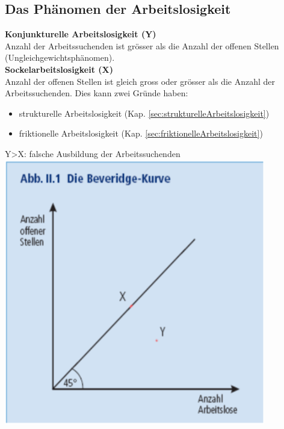 \subsection{Das Phänomen der Arbeitslosigkeit}
\begin{multicols}{2}
\textbf{Konjunkturelle Arbeitslosigkeit (Y)}\\
Anzahl der Arbeitssuchenden ist grösser als die Anzahl der offenen Stellen (Ungleichgewichtsphänomen).\\
\textbf{Sockelarbeitslosigkeit (X)}\\
Anzahl der offenen Stellen ist gleich gross oder grösser als die Anzahl der Arbeitssuchenden. Dies kann zwei Gründe haben:
\begin{itemize}
	\item strukturelle Arbeitslosigkeit (Kap. \ref{sec:strukturelleArbeitslosigkeit})
	\item friktionelle Arbeitslosigkeit (Kap. \ref{sec:friktionelleArbeitslosigkeit})
\end{itemize}
\vspace{\baselineskip}
Y>X: falsche Ausbildung der Arbeitssuchenden
\vfill\null
\columnbreak
\includegraphics[width=0.8\linewidth]{images/arbeitslosigkeit.png}
\end{multicols}

